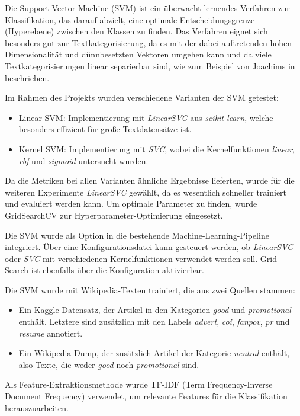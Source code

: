 Die Support Vector Machine (SVM) ist ein überwacht lernendes Verfahren zur Klassifikation, das darauf abzielt, eine optimale Entscheidungsgrenze (Hyperebene) zwischen den Klassen zu finden. Das Verfahren eignet sich besonders gut zur Textkategorisierung, da es mit der dabei auftretenden hohen Dimensionalität und dünnbesetzten Vektoren umgehen kann und da viele Textkategorisierungen linear separierbar sind, wie zum Beispiel von Joachims in \cite{textCategorizationWithSVM} beschrieben.

Im Rahmen des Projekts wurden verschiedene Varianten der SVM getestet:

\begin{itemize}
    \item Linear SVM: Implementierung mit \textit{LinearSVC} aus \textit{scikit-learn}, welche besonders effizient für große Textdatensätze ist.
    \item Kernel SVM: Implementierung mit \textit{SVC}, wobei die Kernelfunktionen \textit{linear}, \textit{rbf} und \textit{sigmoid} untersucht wurden.
\end{itemize}

Da die Metriken bei allen Varianten ähnliche Ergebnisse lieferten, wurde für die weiteren Experimente \textit{LinearSVC} gewählt, da es wesentlich schneller trainiert und evaluiert werden kann. Um optimale Parameter zu finden, wurde GridSearchCV zur Hyper\-parameter-Optimierung eingesetzt.

Die SVM wurde als Option in die bestehende Machine-Learning-Pipeline integriert. Über eine Konfigurationsdatei kann gesteuert werden, ob \textit{LinearSVC} oder \textit{SVC} mit verschiedenen Kernelfunktionen verwendet werden soll. Grid Search ist ebenfalls über die Konfiguration aktivierbar.

Die SVM wurde mit Wikipedia-Texten trainiert, die aus zwei Quellen stammen:
\begin{itemize}
    \item Ein Kaggle-Datensatz, der Artikel in den Kategorien \textit{good} und \textit{promotional} enthält. Letztere sind zusätzlich mit den Labels \textit{advert}, \textit{coi}, \textit{fanpov}, \textit{pr} und \textit{resume} annotiert.
    \item Ein Wikipedia-Dump, der zusätzlich Artikel der Kategorie \textit{neutral} enthält, also Texte, die weder \textit{good} noch \textit{promotional} sind.
\end{itemize}

Als Feature-Extraktionsmethode wurde TF-IDF (Term Frequency-Inverse Document Frequency) verwendet, um relevante Features für die Klassifikation herauszuarbeiten.

